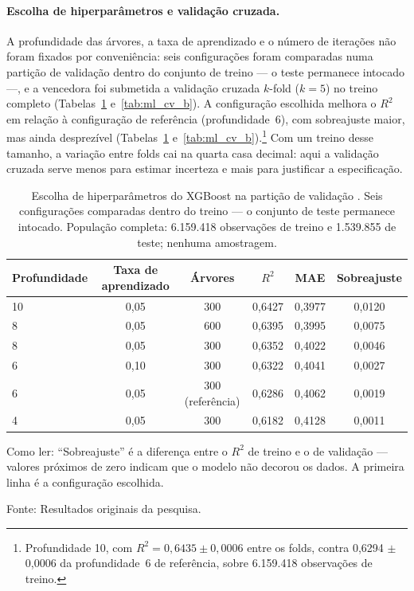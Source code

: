 \documentclass[11pt, a4paper, oneside]{article}
\begin{document}
\paragraph{Escolha de hiperparâmetros e validação cruzada.}
A profundidade das árvores, a taxa de aprendizado e o número de iterações não foram
fixados por conveniência: seis configurações foram comparadas numa partição de validação
{dentro} do conjunto de treino --- o teste permanece intocado ---, e a vencedora foi
submetida a validação cruzada $k$-{fold} ($k=5$) no treino completo
(Tabelas~\ref{tab:ml_cv} e~\ref{tab:ml_cv_b}). A configuração escolhida melhora o $R^2$ em relação à configuração de referência
(profundidade~6), com sobreajuste maior, mas ainda desprezível
(Tabelas~\ref{tab:ml_cv} e~\ref{tab:ml_cv_b}).\footnote{Profundidade 10, com
$R^2 = 0,6435 \pm 0,0006$ entre os {folds}, contra
0,6294 $\pm$ 0,0006 da profundidade~6 de referência, sobre
6.159.418 observações de treino.} Com um treino desse tamanho, a variação entre
{folds} cai na quarta casa decimal: aqui a validação cruzada serve menos para
estimar incerteza e mais para justificar a especificação.
\begin{table}[!ht]
\centering
\caption{Escolha de hiperparâmetros do XGBoost na partição de validação
\cite{alencar2026a, alencar2026b, alencar2026c, geron2021}. Seis configurações comparadas
{dentro} do treino --- o conjunto de teste permanece intocado. População completa:
6.159.418 observações de treino e 1.539.855 de teste; nenhuma amostragem.}
\label{tab:ml_cv}
\small
\begin{tabular}{lccccc}
\toprule
Profundidade & Taxa de aprendizado & Árvores & $R^2$ & MAE & Sobreajuste \\
\midrule
{10} & 0,05 & 300 & 0,6427 & 0,3977 & 0,0120 \\
8 & 0,05 & 600 & 0,6395 & 0,3995 & 0,0075 \\
8 & 0,05 & 300 & 0,6352 & 0,4022 & 0,0046 \\
6 & 0,10 & 300 & 0,6322 & 0,4041 & 0,0027 \\
6 & 0,05 & 300 (referência) & 0,6286 & 0,4062 & 0,0019 \\
4 & 0,05 & 300 & 0,6182 & 0,4128 & 0,0011 \\
\bottomrule
\end{tabular}
\normalsize
\par\smallskip
\footnotesize{Como ler:} ``Sobreajuste'' é a diferença entre o $R^2$ de treino e o de
validação --- valores próximos de zero indicam que o modelo não decorou os dados. A
primeira linha é a configuração escolhida.
\par\smallskip\footnotesize Fonte: Resultados originais da pesquisa.
\end{table}
\end{document}
